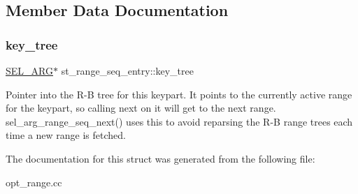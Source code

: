 \subsection{Member Data Documentation}
\mbox{\label{structst__range__seq__entry_a2eb5297b7ad3342bd4bb40d95fa7d839}} 
\subsubsection{\texorpdfstring{key\+\_\+tree}{key\_tree}}
{\footnotesize\ttfamily \mbox{\hyperlink{classSEL__ARG}{S\+E\+L\+\_\+\+A\+RG}}$\ast$ st\+\_\+range\+\_\+seq\+\_\+entry\+::key\+\_\+tree}

Pointer into the R-\/B tree for this keypart. It points to the currently active range for the keypart, so calling next on it will get to the next range. sel\+\_\+arg\+\_\+range\+\_\+seq\+\_\+next() uses this to avoid reparsing the R-\/B range trees each time a new range is fetched. 

The documentation for this struct was generated from the following file\+:\begin{DoxyCompactItemize}
\item 
opt\+\_\+range.\+cc\end{DoxyCompactItemize}

